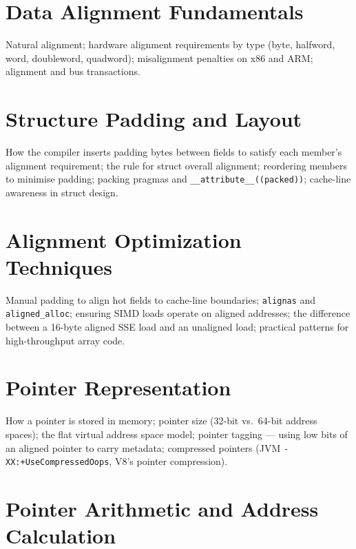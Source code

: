 \chapter{Data Alignment Fundamentals}
\label{ch:alignment-fundamentals}

Natural alignment; hardware alignment requirements by type (byte, halfword,
word, doubleword, quadword); misalignment penalties on x86 and ARM;
alignment and bus transactions.

\chapter{Structure Padding and Layout}
\label{ch:struct-padding}

How the compiler inserts padding bytes between fields to satisfy each
member's alignment requirement; the rule for struct overall alignment;
reordering members to minimise padding; packing pragmas and
\texttt{\_\_attribute\_\_((packed))}; cache-line awareness in struct design.

\chapter{Alignment Optimization Techniques}
\label{ch:alignment-optimization}

Manual padding to align hot fields to cache-line boundaries;
\texttt{alignas} and \texttt{aligned\_alloc}; ensuring SIMD loads operate
on aligned addresses; the difference between a 16-byte aligned SSE load
and an unaligned load; practical patterns for high-throughput array code.



\chapter{Pointer Representation}
\label{ch:pointer-repr}

How a pointer is stored in memory; pointer size (32-bit vs.\ 64-bit address
spaces); the flat virtual address space model; pointer tagging — using low
bits of an aligned pointer to carry metadata; compressed pointers (JVM
\texttt{-XX:+UseCompressedOops}, V8's pointer compression).

\chapter{Pointer Arithmetic and Address Calculation}
\label{ch:pointer-arithmetic}

